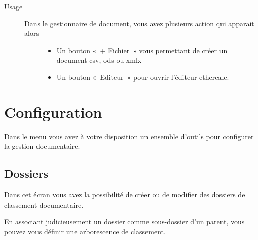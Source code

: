 \documentclass[a4paper,10pt,oneside,french]{sphinxmanual}
\begin{document}
\begin{sphinxVerbatim}[commandchars=\\\{\}]
   
\end{sphinxVerbatim}
\begin{description}
\item[{Usage}] \leavevmode\begin{description}
\item[{Dans le gestionnaire de document, vous avez plusieurs action qui apparait alors}] \leavevmode\begin{itemize}
\item {} 
Un bouton « + Fichier » vous permettant de créer un document csv, ods ou xmlx

\item {} 
Un bouton « Editeur » pour ouvrir l’éditeur ethercalc.

\end{itemize}

\end{description}

\end{description}

\noindent{}


\section{Configuration}
\label{\detokenize{documents/configuration:configuration}}\label{\detokenize{documents/configuration::doc}}
Dans le menu  vous avez à votre disposition un ensemble d’outils pour configurer la gestion documentaire.


\subsection{Dossiers}
\label{\detokenize{documents/configuration:dossiers}}
Dans cet écran vous avez la possibilité de créer ou de modifier des dossiers de classement documentaire.

\noindent{}

En associant judicieusement un dossier comme sous-dossier d’un parent, vous pouvez vous définir une arborescence de classement.
\end{document}
